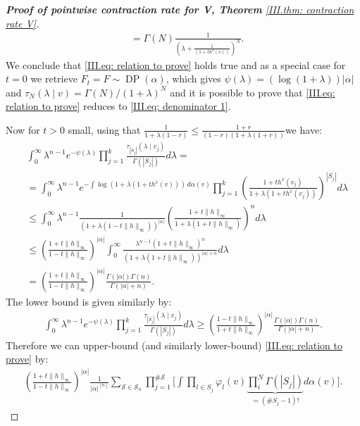 \begin{proof}[\hypertarget{III.proof contraction pointwise V}{\textbf{Proof of pointwise contraction rate for V, Theorem} \ref{III.thm: contraction rate V}}]
\begin{align*}
        &= \Gamma(N)\frac{1}{(\lambda + \frac{1}{(1+th^x(v))})^N}.
    \end{align*}
    We conclude that \eqref{III.eq: relation to prove} holds true and as a special case for $t=0$ we retrieve $F_t= F \sim \operatorname{DP}(\alpha)$, which gives $\psi(\lambda) = (\log{(1+\lambda)})|\alpha|$ and $\tau_{\scriptscriptstyle{N}} (\lambda \mid v)= \Gamma(N)/(1+\lambda)^{N}$ and it is possible to prove that \eqref{III.eq: relation to prove} reduces to \eqref{III.eq: denominator 1}.

    Now for $t>0$ small, using that $\frac{1}{1 + \lambda(1-r)} \leq \frac{1+r}{(1-r)(1+\lambda(1+r))}$we have: 
    \begin{align*}
    & \int_0^{\infty} \lambda^{n-1} e^{-\psi(\lambda)} \prod_{j=1}^k \frac{\tau_{\scriptscriptstyle{\left|S_j\right|}}\left(\lambda \mid v_j\right)}{\Gamma\left(\left|S_j\right|\right)} d \lambda= \\
    & =\int_0^{\infty} \lambda^{n-1} e^{-\int \log (1+\lambda(1+t h^x(v))) \, d \alpha (v) } \prod_{j=1}^k\left(\frac{1+t h^x\left(v_j\right)}{1+\lambda\left(1+t h^x\left(v_j\right)\right)}\right)^{\left|S_j\right|} d \lambda \\
    & \leq \int_0^{\infty} \lambda^{n-1} \frac{1}{\left(1+\lambda\left(1-t\|h\|_{\infty}\right)\right)^{|\alpha|}}\left(\frac{1+t\|h\|_{\infty}}{1+\lambda\left(1+t\|h\|_{\infty}\right)}\right)^n d \lambda \\
    &\leq \left(\frac{1+t\|h\|_{\infty}}{1-t\|h\|_{\infty}}\right)^{|\alpha|} \int_0^{\infty} \frac{\lambda^{n-1}\left(1+t\|h\|_{\infty}\right)^n}{\left(1+\lambda\left(1+t\|h\|_{\infty}\right)\right)^{|\alpha|+n}} d \lambda \\
    &= \left(\frac{1+t\|h\|_{\infty}}{1-t\|h\|_{\infty}}\right)^{|\alpha|} \frac{\Gamma(|\alpha|) \Gamma(n)}{\Gamma(|\alpha| + n)}.
    \end{align*}
    The lower bound is given similarly by:
    \begin{align*}
        \int_0^{\infty} \lambda^{n-1} e^{-\psi(\lambda)} \prod_{j=1}^k \frac{\tau_{\scriptscriptstyle{\left|S_j\right|}}\left(\lambda \mid v_j\right)}{\Gamma\left(\left|S_j\right|\right)} d \lambda \geq \left(\frac{1-t\|h\|_{\infty}}{1+t\|h\|_{\infty}}\right)^{|\alpha|} \frac{\Gamma(|\alpha|) \Gamma(n)}{\Gamma(|\alpha| + n)}.
    \end{align*}
    Therefore we can upper-bound (and similarly lower-bound) \eqref{III.eq: relation to prove} by: 
    \begin{align*}
        \left(\frac{1+t\|h\|_{\infty}}{1-t\|h\|_{\infty}}\right)^{|\alpha|} \frac{1}{|\alpha|^{[n]}} \sum_{\mathcal{S} \in \mathscr{S}_n} \prod_{j=1}^{\# \mathcal{S}}\bigg[ \int \prod_{l \in S_j} \varphi_l(v) \underbrace{\prod_{i}^{N} \Gamma(|S_j|)}_{=\left(\# S_j-1\right) !} d \alpha(v)\bigg] . 

\end{align*}
\end{proof}
